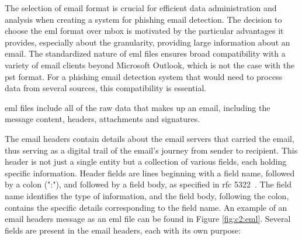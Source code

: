 The selection of email format is crucial for efficient data administration and analysis when creating a system for phishing email detection. The decision to choose the \ac{eml} format over \ac{mbox} is motivated by the particular advantages it provides, especially about the granularity, providing large information about an email. The standardized nature of \ac{eml} files ensures broad compatibility with a variety of email clients beyond Microsoft Outlook, which is not the case with the \ac{pst} format. For a phishing email detection system that would need to process data from several sources, this compatibility is essential.

\ac{eml} files include all of the raw data that makes up an email, including the message content, headers, attachments and signatures. 



The email headers contain details about the email servers that carried the email, thus serving as a digital trail of the email's journey from sender to recipient. This header is not just a single entity but a collection of various fields, each holding specific information.  Header fields are lines beginning with a field name, followed by a colon (":"), and followed by a field body, as specified in \ac{rfc} 5322~\cite{rfc5322}. The field name identifies the type of information, and the field body, following the colon, contains the specific details corresponding to the field name.
An example of an email headers message as an \ac{eml} file can be found in Figure \ref{fig:c2:eml}. Several fields are present in the email headers, each with its own purpose:

